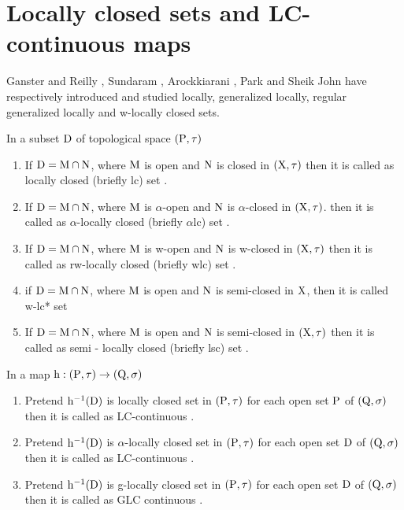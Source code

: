 \section{Locally closed sets and LC-continuous maps}

Ganster and Reilly \cite{Ganster}, Sundaram \cite{Sundaram}, Arockkiarani \cite{Arockiarani}, Park \cite{Park} and Sheik John \cite{Sheik1} have respectively introduced and studied locally, generalized locally, regular generalized locally and w-locally closed sets. 

\begin{dfn}\label{dfn1.5.1}
In a subset $\mathrm{D}$ of topological space $(\mathrm{P}, \tau)$ 
\begin{enumerate}[\rm (i)]
\item If $\mathrm{D}=\mathrm{M} \cap \mathrm{N}$, where $\mathrm{M}$ is open and $\mathrm{N}$ is closed in $(\mathrm{X},\tau)$ then it is called as locally closed (briefly lc) set \cite{Reilly1}. 
\item If $\mathrm{D}=\mathrm{M} \cap \mathrm{N}$, where $\mathrm{M}$ is $\alpha$-open and $\mathrm{N}$ is $\alpha$-closed in $(\mathrm{X}, \tau)$. then it is called as $\alpha$-locally closed (briefly $\alpha$lc) set \cite{Njastad}.
\item If $\mathrm{D}=\mathrm{M} \cap \mathrm{N}$, where $\mathrm{M}$ is w-open and $\mathrm{N}$ is w-closed in $(\mathrm{X}, \tau)$ then it is called as rw-locally closed (briefly wlc) set \cite{Sheik1}.
\item \cite{Sheik1} if $\mathrm{D}=\mathrm{M} \cap \mathrm{N}$, where $\mathrm{M}$ is open and $\mathrm{N}$ is semi-closed in $\mathrm{X}$, then it is called w-lc* set
\item If $\mathrm{D}=\mathrm{M}\cap \mathrm{N}$, where $\mathrm{M}$ is open and $\mathrm{N}$ is semi-closed in $(\mathrm{X}, \tau)$ then it is called as semi - locally closed (briefly lsc) set \cite{Balachandran}.
\end{enumerate}
\end{dfn}

\begin{dfn}\label{dfn1.5.2} 
In a map $\mathrm{h}: (\mathrm{P}, \tau) \rightarrow (\mathrm{Q}, \sigma)$ 
\begin{enumerate}[\rm (i)]
\item Pretend $\mathrm{h}^{-1}(\mathrm{D})$ is locally closed set in $(\mathrm{P}, \tau)$ for each open set $\mathrm{P}$ of $(\mathrm{Q}, \sigma)$ then it is called as LC-continuous \cite{Reilly1}.
\item Pretend $\mathrm{h}^{-1}(\mathrm{D})$ is $\alpha$-locally closed set in $(\mathrm{P}, \tau)$ for each open set $\mathrm{D}$ of $(\mathrm{Q}, \sigma)$ then it is called as LC-continuous \cite{Njastad}.
\item Pretend $\mathrm{h}^{-1}(\mathrm{D})$ is g-locally closed set in $(\mathrm{P},\tau)$ for each open set $\mathrm{D}$ of $(\mathrm{Q}, \sigma)$ then it is called as GLC continuous \cite{Balachandran}.
\end{enumerate}
\end{dfn}

